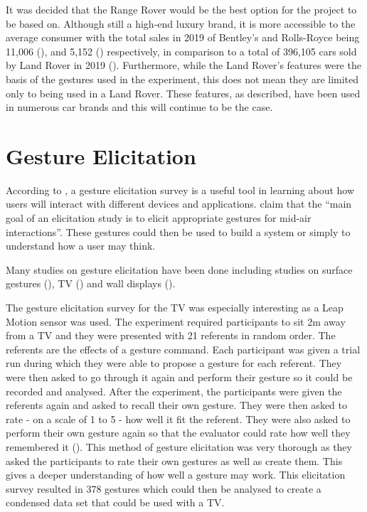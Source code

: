 \documentclass{l4proj}
\begin{document}
It was decided that the Range Rover would be the best option for the project to be based on. Although still a high-end luxury brand, it is more accessible to the average consumer with the total sales in 2019 of Bentley’s and Rolls-Royce being 11,006 (\cite{bentley_Bekker_2020}), and 5,152 (\cite{Rolls_Bekker_2020}) respectively, in comparison to a total of 396,105 cars sold by Land Rover in 2019 (\cite{Statista_2020}). Furthermore, while the Land Rover's features were the basis of the gestures used in the experiment, this does not mean they are limited only to being used in a Land Rover. These features, as described, have been used in numerous car brands and this will continue to be the case.


\section{Gesture Elicitation}
According to \cite{Villarreal_Narvaez_Vanderdonckt_Vatavu_Wobbrock_2020}, a gesture elicitation survey is a useful tool in learning about how users will interact with different devices and applications. \cite{Vogiatzidakis_Koutsabasis_2018} claim that the “main goal of an elicitation study is to elicit appropriate gestures for mid-air interactions”. These gestures could then be used to build a system or simply to understand how a user may think.

Many studies on gesture elicitation have been done including studies on surface gestures (\cite{Morris_Wobbrock_Wilson_2010}), TV (\cite{Vatavu_Zaiti_2014}) and wall displays (\cite{Wittorf_Jakobsen_2016}). 

The gesture elicitation survey for the TV was especially interesting as a Leap Motion sensor was used. The experiment required participants to sit 2m away from a TV and they were presented with 21 referents in random order. The referents are the effects of a gesture command. Each participant was given a trial run during which they were able to propose a gesture for each referent. They were then asked to go through it again and perform their gesture so it could be recorded and analysed. After the experiment, the participants were given the referents again and asked to recall their own gesture. They were then asked to rate - on a scale of 1 to 5 - how well it fit the referent. They were also asked to perform their own gesture again so that the evaluator could rate how well they remembered it (\cite{Vatavu_Zaiti_2014}). This method of gesture elicitation was very thorough as they asked the participants to rate their own gestures as well as create them. This gives a deeper understanding of how well a gesture may work. This elicitation survey resulted in 378 gestures which could then be analysed to create a condensed data set that could be used with a TV.
\end{document}
